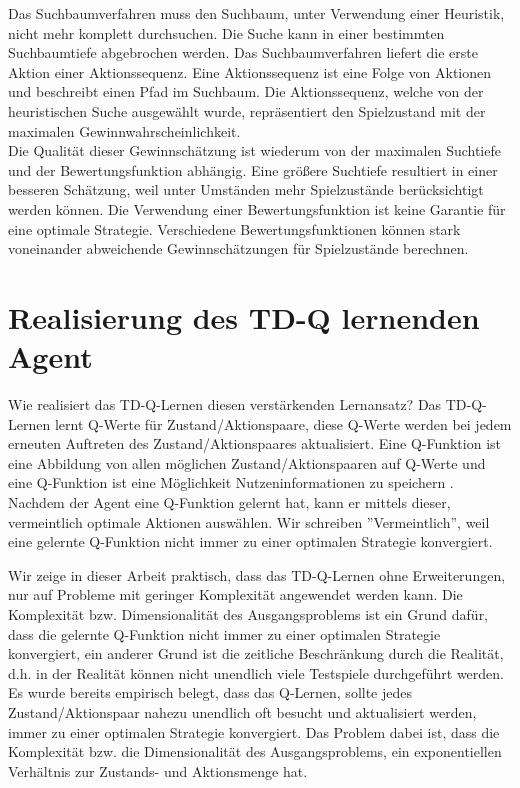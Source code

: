 Das Suchbaumverfahren muss den Suchbaum, unter Verwendung einer Heuristik, nicht mehr komplett durchsuchen. Die Suche kann in einer bestimmten Suchbaumtiefe abgebrochen werden. Das Suchbaumverfahren liefert die erste Aktion einer Aktionssequenz. Eine Aktionssequenz ist eine Folge von Aktionen und beschreibt einen Pfad im Suchbaum. Die Aktionssequenz, welche von der heuristischen Suche ausgewählt wurde, repräsentiert den Spielzustand mit der maximalen Gewinnwahrscheinlichkeit. \\

Die Qualität dieser Gewinnschätzung ist wiederum von der maximalen Suchtiefe und der Bewertungsfunktion abhängig. Eine größere Suchtiefe resultiert in einer besseren Schätzung, weil unter Umständen mehr Spielzustände berücksichtigt werden können. Die Verwendung einer Bewertungsfunktion ist keine Garantie für eine optimale Strategie. Verschiedene Bewertungsfunktionen können stark voneinander abweichende Gewinnschätzungen für Spielzustände berechnen. \\

\section{Realisierung des TD-Q lernenden Agent}


Wie realisiert das TD-Q-Lernen diesen verstärkenden Lernansatz? Das TD-Q-Lernen lernt Q-Werte für Zustand/Aktionspaare, diese Q-Werte werden bei jedem erneuten Auftreten des Zustand/Aktionspaares aktualisiert. Eine Q-Funktion ist eine Abbildung von allen möglichen Zustand/Aktionspaaren auf Q-Werte und eine Q-Funktion ist eine Möglichkeit Nutzeninformationen zu speichern \cite[974]{Russell}. Nachdem der Agent eine Q-Funktion gelernt hat, kann er mittels dieser, vermeintlich optimale Aktionen auswählen. Wir schreiben ''Vermeintlich'', weil eine gelernte Q-Funktion nicht immer zu einer optimalen Strategie konvergiert.

Wir zeige in dieser Arbeit praktisch, dass das TD-Q-Lernen ohne Erweiterungen, nur auf Probleme mit geringer Komplexität angewendet werden kann. Die Komplexität bzw. Dimensionalität des Ausgangsproblems ist ein Grund dafür, dass die gelernte Q-Funktion nicht immer zu einer optimalen Strategie konvergiert, ein anderer Grund ist die zeitliche Beschränkung durch die Realität, d.h. in der Realität können nicht unendlich viele Testspiele durchgeführt werden. Es wurde bereits empirisch belegt, dass das Q-Lernen, sollte jedes Zustand/Aktionspaar nahezu unendlich oft besucht und aktualisiert werden, immer zu einer optimalen Strategie konvergiert. Das Problem dabei ist, dass die Komplexität bzw. die Dimensionalität des Ausgangsproblems, ein exponentiellen Verhältnis zur Zustands- und Aktionsmenge hat. \\

